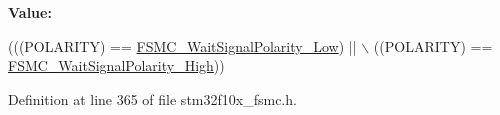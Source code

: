 {\bfseries Value\+:}
\begin{DoxyCode}
(((POLARITY) == \hyperlink{group___f_s_m_c___wait___signal___polarity_ga7dc72fdfc6225e5daa9b8efee8dff49f}{FSMC\_WaitSignalPolarity\_Low}) || \(\backslash\)
                                         ((POLARITY) == 
      \hyperlink{group___f_s_m_c___wait___signal___polarity_ga3418f29249a261edb1359d1bcdc43661}{FSMC\_WaitSignalPolarity\_High}))
\end{DoxyCode}


Definition at line 365 of file stm32f10x\+\_\+fsmc.\+h.

